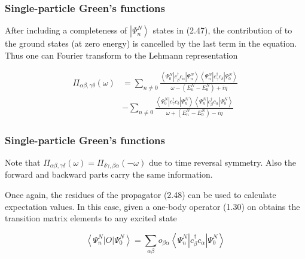 \documentclass[compress]{beamer}
\begin{document}
\frame
{
\frametitle{Single-particle Green's functions}
\begin{small}
{\scriptsize

  After including a completeness of $\left|\Psi_{n}^{N}\right\rangle$
states in (2.47), the contribution of to the ground states (at zero
energy) is cancelled by the last term in the equation. Thus one can
Fourier transform to the Lehmann representation

$$
\begin{aligned}
\Pi_{\alpha \beta, \gamma \delta}(\omega) & =\sum_{n \neq 0} \frac{\left\langle\Psi_{0}^{N}\left|c_{\beta}^{\dagger} c_{\alpha}\right| \Psi_{n}^{N}\right\rangle\left\langle\Psi_{n}^{N}\left|c_{\gamma}^{\dagger} c_{\delta}\right| \Psi_{0}^{N}\right\rangle}{\omega-\left(E_{n}^{N}-E_{0}^{N}\right)+i \eta} \\
& -\sum_{n \neq 0} \frac{\left\langle\Psi_{0}^{N}\left|c_{\gamma}^{\dagger} c_{\delta}\right| \Psi_{n}^{N}\right\rangle\left\langle\Psi_{n}^{N}\left|c_{\beta}^{\dagger} c_{\alpha}\right| \Psi_{0}^{N}\right\rangle}{\omega+\left(E_{n}^{N}-E_{0}^{N}\right)-i \eta}
\end{aligned}
$$

}
\end{small}
}
\frame
{
\frametitle{Single-particle Green's functions}
\begin{small}
{\scriptsize
Note that $\Pi_{\alpha \beta, \gamma \delta}(\omega)=\Pi_{\delta
  \gamma, \beta \alpha}(-\omega)$ due to time reversal symmetry. Also
the forward and backward parts carry the same information.

Once again, the residues of the propagator (2.48) can be used to
calculate expectation values. In this case, given a one-body operator
(1.30) on obtains the transition matrix elements to any excited state

$$
\left\langle\Psi_{n}^{N}|O| \Psi_{0}^{N}\right\rangle=\sum_{\alpha \beta} o_{\beta \alpha}\left\langle\Psi_{n}^{N}\left|c_{\beta}^{\dagger} c_{\alpha}\right| \Psi_{0}^{N}\right\rangle
$$

}
\end{small}
}
\frame
\end{document}
